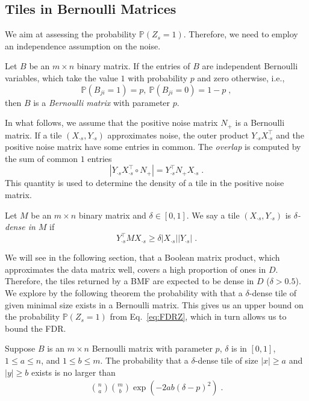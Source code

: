 \subsection{Tiles in Bernoulli Matrices}
We aim at assessing the probability $\mathbb{P}(Z_s=1)$. Therefore, we need to employ an independence assumption on the noise. 
\begin{definition}
Let $B$ be an $m\times n$ binary matrix. If the entries of $B$ are independent Bernoulli variables, which take the value $1$ with probability $p$ and zero otherwise, i.e., 
\[\mathbb{P}(B_{ji}=1)=p,\ \mathbb{P}(B_{ji}=0)=1-p\;,\]
then $B$ is a \emph{Bernoulli matrix} with parameter $p$.
\end{definition}
In what follows, we assume that the positive noise matrix $N_+$ is a Bernoulli matrix. If a tile $(X_{\cdot s},Y_{\cdot s})$ approximates noise, the outer product $Y_{\cdot s}X_{\cdot s}^\top$ and the positive noise matrix have some entries in common. The \emph{overlap} is computed by the sum of common $1$ entries
\[|Y_{\cdot s}X_{\cdot s}^\top\circ N_+|=Y_{\cdot s}^\top N_+X_{\cdot s}\;.\]
This quantity is used to determine the density of a tile in the positive noise matrix.
\begin{definition}
Let $M$ be an $m\times n$ binary matrix and $\delta\in[0,1]$. We say a tile $(X_{\cdot s},Y_{\cdot s})$ is \emph{$\delta$-dense in $M$}  if
\[Y_{\cdot s}^\top M X_{\cdot s} \geq \delta |X_{\cdot s}||Y_{\cdot s}|\;.\]
\end{definition}
We will see in the following section, that a Boolean matrix product, which approximates the data matrix well, covers a high proportion of ones in $D$. Therefore, the tiles returned by a BMF are expected to be dense in $D$ ($\delta>0.5$). We explore by the following theorem the probability with that a $\delta$-dense tile of given minimal size exists in a Bernoulli matrix. This gives us an upper bound on the probability $\mathbb{P}(Z_s=1)$ from Eq.~\eqref{eq:FDRZ}, which in turn allows us to bound the FDR.
\begin{theorem}\label{thm:densProb}
Suppose $B$ is an $m\times n$ Bernoulli matrix with parameter $p$, $\delta$ is in $[0,1]$, $1\leq a\leq n$, and $1\leq b\leq m$. 
The probability that a $\delta$-dense tile of size $|x|\geq a$ and $|y|\geq b$ exists is no larger than
\begin{align}\label{eq:densBound}
\binom{n}{a}\binom{m}{b}\exp(-2ab(\delta-p)^2)\;.
\end{align}
\end{theorem}

